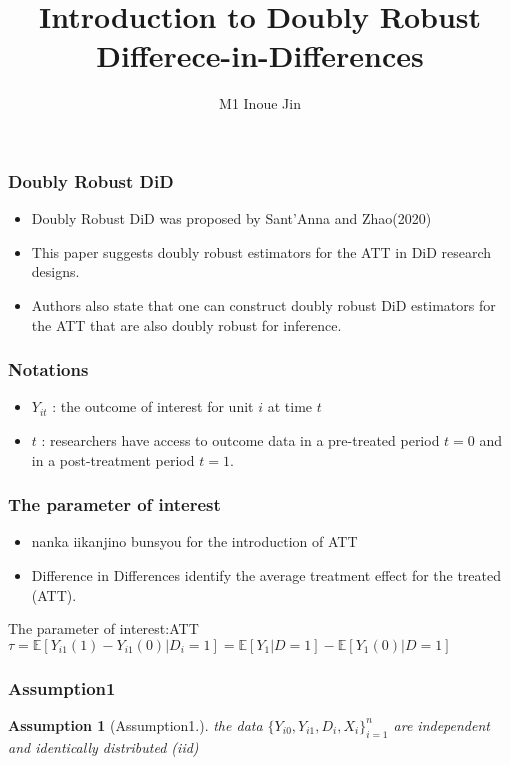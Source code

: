 \documentclass{beamer}
\title{Introduction to Doubly Robust Differece-in-Differences}
\author{M1 Inoue Jin}
\institute{Hitotsubashi University}
\newtheorem{assumption}[thm]{Assumption}
\begin{document}
\begin{frame}
    \titlepage
\end{frame}

\begin{frame}\frametitle{Doubly Robust DiD}
    \begin{itemize}
        \item Doubly Robust DiD was proposed by Sant'Anna and Zhao(2020)
        \item This paper suggests doubly robust estimators for the ATT in DiD research designs.
        \item Authors also state that one can construct doubly robust DiD estimators for the ATT that are also doubly robust for inference.
    \end{itemize}
\end{frame}

\begin{frame}\frametitle{Notations}
    \begin{itemize}
        \item $Y_{it}$ : the outcome of interest for unit $i$ at time $t$
        \item $t$ : researchers have access to outcome data in a pre-treated period $t = 0$ and in a post-treatment period $t = 1$.
    \end{itemize}

\end{frame}

\begin{frame}\frametitle{The parameter of interest}
    \begin{itemize}
        \item nanka iikanjino bunsyou for the introduction of ATT
        \item Difference in Differences identify the average treatment effect for the treated (ATT). 
    \end{itemize}
    \begin{block}{The parameter of interest:ATT}
        $\tau = \mathbb{E}[Y_{i1}(1) - Y_{i1}(0)| D_{i} = 1] = \mathbb{E}[Y_{1} |D = 1] - \mathbb{E}[Y_{1}(0) | D = 1]$
    \end{block}
\end{frame}

\begin{frame}\frametitle{Assumption1}
    \begin{assumption}[Assumption1.]
        the data $\{Y_{i0}, Y_{i1}, D_{i}, X_{i}\}^{n}_{i = 1}$ are independent and identically distributed (iid)
    \end{assumption}
\end{frame}
\end{document}
